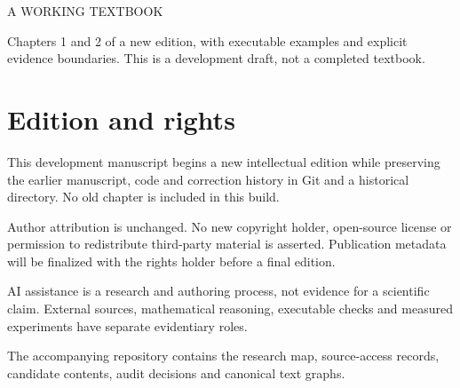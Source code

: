\documentclass[11pt,oneside,openany]{book}
\begin{document}
\frontmatter
\begin{titlepage}
\vspace*{22mm}
{\sffamily\color{BookBlue}\large A WORKING TEXTBOOK\par}
\vspace{12mm}
{\Huge\bfseries\BookTitle\par}
\vspace{7mm}
{\Large\BookSubtitle\par}
\vspace{20mm}
{\large\EditionLabel\par}
\vfill
Chapters 1 and 2 of a new edition, with executable examples and explicit evidence
boundaries. This is a development draft, not a completed textbook.\par
\vspace{8mm}
{\sffamily\EditionDate\par}
\end{titlepage}
\chapter*{Edition and rights}
This development manuscript begins a new intellectual edition while preserving
the earlier manuscript, code and correction history in Git and a historical
directory. No old chapter is included in this build.

Author attribution is unchanged. No new copyright holder, open-source license
or permission to redistribute third-party material is asserted. Publication
metadata will be finalized with the rights holder before a final edition.

AI assistance is a research and authoring process, not evidence for a scientific
claim. External sources, mathematical reasoning, executable checks and measured
experiments have separate evidentiary roles.

The accompanying repository contains the research map, source-access records,
candidate contents, audit decisions and canonical text graphs.
\tableofcontents

\mainmatter

\backmatter


\printnoidxglossary
\printindex
\end{document}
